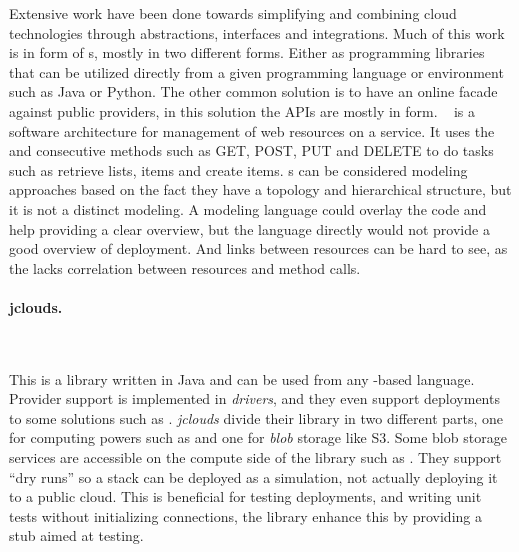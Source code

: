 Extensive work have been done towards simplifying and combining cloud technologies through
abstractions, interfaces and integrations.
Much of this work is in form of s, mostly in two different forms.
Either as programming libraries that can be utilized directly from a given 
programming language or environment such as Java or Python.
The other common solution is to have an online facade against public providers,
in this solution the APIs are mostly in  form.
~\cite{rest:fielding00} is a software architecture for management of web resources
on a service. It uses the  and consecutive methods such as GET, POST, PUT and DELETE
to do tasks such as retrieve lists, items and create items.
s can be considered modeling approaches based on the fact they have a topology 
and hierarchical structure, 
but it is not a distinct modeling. 
A modeling language could overlay the code and help providing a clear overview, 
but the language directly would not provide a good overview of deployment. 
And links between resources can be hard to see, 
as the  lacks correlation between resources and method calls. 




\paragraph{jclouds.}~\cite{jclouds}

This is a library written in Java and can be used from any -based language.
Provider support is implemented in \emph{drivers}, and they even support deployments
to some  solutions such as .
\emph{jclouds} divide their library in two different parts, one for computing powers 
such as  and one for \emph{blob} storage like S3. 
Some blob storage services are accessible on the compute side of the library such
as .
They support ``dry runs'' so a stack can be deployed as a simulation, not 
actually deploying it to a public cloud.
This is beneficial for testing deployments, and writing unit tests without initializing
connections, the library enhance this by providing a stub aimed at testing.

